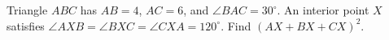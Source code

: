Triangle $ABC$ has $AB=4$, $AC=6$, and $\angle BAC=30^\circ$. An interior point $X$ satisfies $\angle AXB=\angle BXC=\angle CXA=120^\circ$. Find $(AX+BX+CX)^2$.

